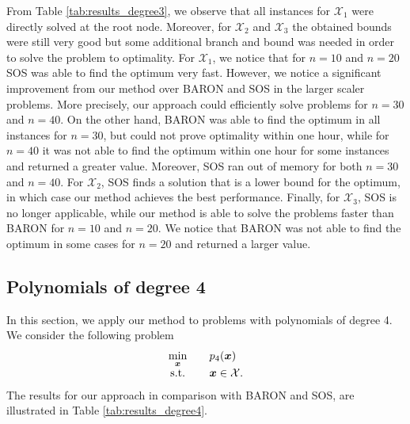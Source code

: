\documentclass[opre,nonblindrev]{informs3} %
\begin{document}
From Table \ref{tab:results_degree3}, we observe that all instances for $\mathcal{X}_1$ were directly solved at the root node. Moreover, for $\mathcal{X}_2$ and $\mathcal{X}_3$ the obtained bounds were still very good but some additional branch and bound was needed in order to solve the problem to optimality. For $\mathcal{X}_1$, we notice that for $n=10$ and $n=20$ SOS was able to find the optimum very fast. However, we notice a significant improvement from our method over BARON and SOS in the larger scaler problems. More precisely, our approach could efficiently solve problems for $n=30$ and $n=40$. On the other hand, BARON was able to find the optimum in all instances for $n=30$, but could not prove optimality within one hour, while for $n=40$ it was not able to find the optimum within one hour for some instances and returned a greater value. Moreover, SOS ran out of memory for both $n=30$ and $n=40$.  For $ \mathcal{X}_2$, SOS finds a solution that is a lower bound for the optimum, in which case our method achieves the best performance. Finally, for $\mathcal{X}_3$, SOS is no longer applicable, while our method is able to solve the problems faster than BARON for $n=10$ and $n=20$. We notice that BARON was not able to find the optimum in some cases for $n=20$ and returned a larger value.


\subsection{Polynomials of degree 4}  
In this section, we apply our method to problems with polynomials of degree 4. We consider the following problem 
\begin{equation}
    \begin{array}{cll}
        \displaystyle \min_{\boldsymbol{x}} &\quad p_4(\boldsymbol{x}) \\
        {\rm s.t.} 	&\quad \boldsymbol{x} \in \mathcal{X}.
    \end{array} \label{eq:poly4_numexp}
\end{equation}     
The results for our approach in comparison with BARON and SOS, are illustrated in Table \ref{tab:results_degree4}. 
\end{document}
